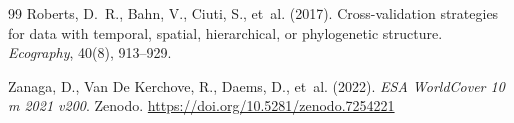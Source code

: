 \documentclass[11pt,a4paper]{article}
\begin{document}
\begin{thebibliography}{99}
Roberts, D.~R., Bahn, V., Ciuti, S., et~al. (2017). Cross-validation strategies for data with
temporal, spatial, hierarchical, or phylogenetic structure. \textit{Ecography}, 40(8),
913--929.

Zanaga, D., Van De Kerchove, R., Daems, D., et~al. (2022). \textit{ESA WorldCover 10 m 2021
v200}. Zenodo. \url{https://doi.org/10.5281/zenodo.7254221}

\end{thebibliography}
\end{document}
